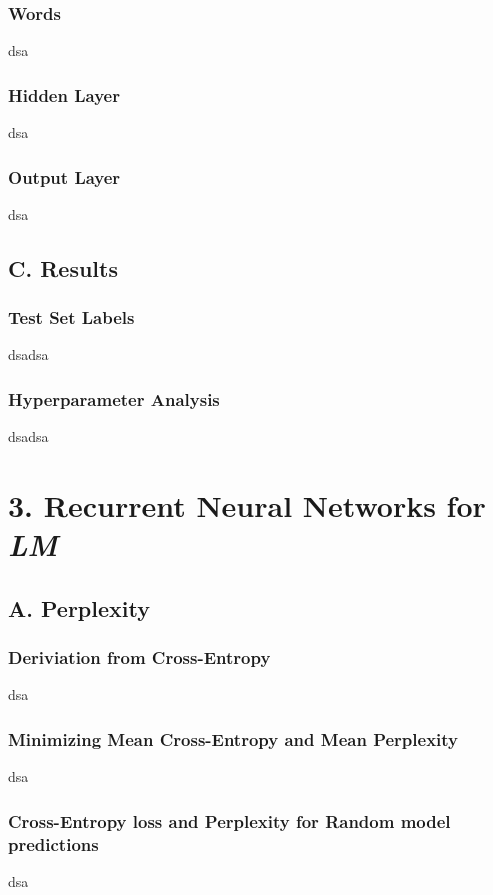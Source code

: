 \documentclass{article}
\begin{document}
\subsubsection*{Words}
dsa

\subsubsection*{Hidden Layer}
dsa

\subsubsection*{Output Layer}
dsa


\subsection*{C. Results}
\subsubsection*{Test Set Labels}
dsadsa

\subsubsection*{Hyperparameter Analysis}
dsadsa



\section*{3. Recurrent Neural Networks for \emph{LM}}
\subsection*{A. Perplexity}
\subsubsection*{Deriviation from Cross-Entropy}
dsa

\subsubsection*{Minimizing Mean Cross-Entropy and Mean Perplexity}
dsa

\subsubsection*{Cross-Entropy loss and Perplexity for \textbf{Random} model predictions}
dsa
\end{document}
